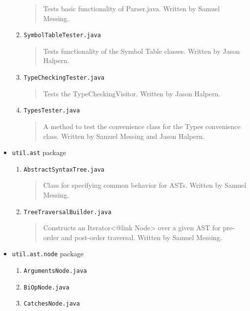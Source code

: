 \documentclass{book}
\begin{document}
\begin{itemize}
\begin{enumerate}
\begin{quotation}
\noindent Tests basic functionality of Parser.java. Written by Samuel Messing.
\end{quotation}
\item \texttt{SymbolTableTester.java}
\begin{quotation}
\noindent Tests functionality of the Symbol Table classes. Written by Jason Halpern. 
\end{quotation}
\item \texttt{TypeCheckingTester.java}
\begin{quotation}
\noindent Tests the TypeCheckingVisitor. Written by Jason Halpern. 
\end{quotation}
\item \texttt{TypesTester.java}
\begin{quotation}
\noindent A method to test the convenience class for the Types convenience class. Written by Samuel Messing and Jason Halpern. 
\end{quotation}
\end{enumerate} %
\item \texttt{util.ast} package
\begin{enumerate}
\item \texttt{AbstractSyntaxTree.java}
\begin{quotation}
\noindent Class for specifying common behavior for ASTs. Written by Samuel Messing. 
\end{quotation}
\item \texttt{TreeTraversalBuilder.java}
\begin{quotation}
\noindent Constructs an Iterator<{@link Node}> over a given AST for pre-order and post-order traversal. Written by Samuel Messing. 
\end{quotation}
\end{enumerate} %
\item \texttt{util.ast.node} package
\begin{enumerate}
\item \texttt{ArgumentsNode.java}
\begin{quotation}
\noindent 
\end{quotation}
\item \texttt{BiOpNode.java}
\begin{quotation}
\noindent 
\end{quotation}
\item \texttt{CatchesNode.java}
\begin{quotation}
\noindent 

\end{quotation}
\end{enumerate}
\end{itemize}
\end{document}

